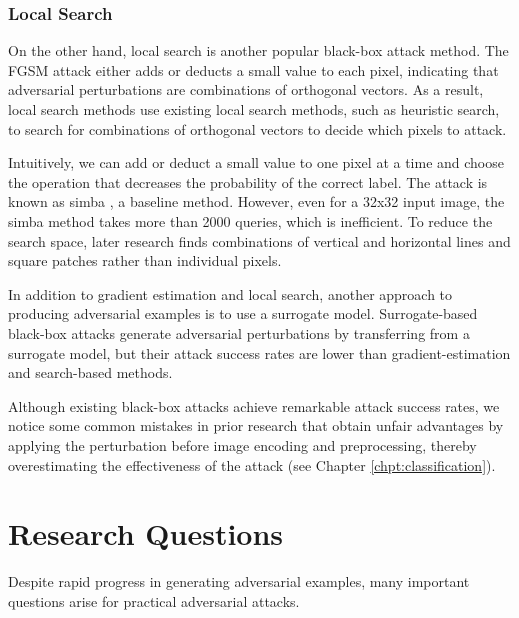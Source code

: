 
\subsubsection{Local Search}

On the other hand, local search is another popular black-box attack method. The FGSM attack either adds or deducts a small value to each pixel, indicating that adversarial perturbations are combinations of orthogonal vectors. As a result, local search methods use existing local search methods, such as heuristic search, to search for combinations of orthogonal vectors to decide which pixels to attack.

Intuitively, we can add or deduct a small value to one pixel at a time and choose the operation that decreases the probability of the correct label. The attack is known as \acrfull{simba} \cite{guo2019simple}, a baseline method. However, even for a 32x32 input image, the \acrshort{simba} method takes more than 2000 queries, which is inefficient. To reduce the search space, later research finds combinations of vertical and horizontal lines and square patches rather than individual pixels.


In addition to gradient estimation and local search, another approach to producing adversarial examples is to use a surrogate model. Surrogate-based black-box attacks generate adversarial perturbations by transferring from a surrogate model, but their attack success rates are lower than gradient-estimation and search-based methods.

Although existing black-box attacks achieve remarkable attack success rates, we notice some common mistakes in prior research that obtain unfair advantages by applying the perturbation before image encoding and preprocessing, thereby overestimating the effectiveness of the attack (see Chapter \ref{chpt:classification}).

\section{Research Questions}
\label{sec:research_question}

Despite rapid progress in generating adversarial examples, many important questions arise for practical adversarial attacks.

